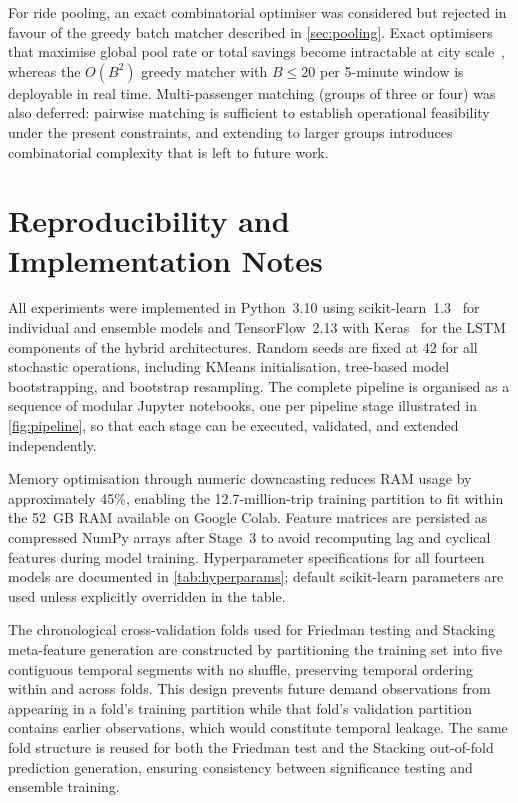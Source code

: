 For ride pooling, an exact combinatorial optimiser was considered but rejected in favour of the greedy batch matcher described in \autoref{sec:pooling}. Exact optimisers that maximise global pool rate or total savings become intractable at city scale~\parencite{agatz2012ridesharing}, whereas the $O(B^2)$ greedy matcher with $B \leq 20$ per 5-minute window is deployable in real time. Multi-passenger matching (groups of three or four) was also deferred: pairwise matching is sufficient to establish operational feasibility under the present constraints, and extending to larger groups introduces combinatorial complexity that is left to future work.

\section{Reproducibility and Implementation Notes}

All experiments were implemented in Python~3.10 using scikit-learn~1.3~\parencite{scikit-learn} for individual and ensemble models and TensorFlow~2.13 with Keras~\parencite{tensorflow2015} for the LSTM components of the hybrid architectures. Random seeds are fixed at 42 for all stochastic operations, including KMeans initialisation, tree-based model bootstrapping, and bootstrap resampling. The complete pipeline is organised as a sequence of modular Jupyter notebooks, one per pipeline stage illustrated in \autoref{fig:pipeline}, so that each stage can be executed, validated, and extended independently.

Memory optimisation through numeric downcasting reduces RAM usage by approximately 45\%, enabling the 12.7-million-trip training partition to fit within the 52~GB RAM available on Google Colab. Feature matrices are persisted as compressed NumPy arrays after Stage~3 to avoid recomputing lag and cyclical features during model training. Hyperparameter specifications for all fourteen models are documented in \autoref{tab:hyperparams}; default scikit-learn parameters are used unless explicitly overridden in the table.

The chronological cross-validation folds used for Friedman testing and Stacking meta-feature generation are constructed by partitioning the training set into five contiguous temporal segments with no shuffle, preserving temporal ordering within and across folds. This design prevents future demand observations from appearing in a fold's training partition while that fold's validation partition contains earlier observations, which would constitute temporal leakage. The same fold structure is reused for both the Friedman test and the Stacking out-of-fold prediction generation, ensuring consistency between significance testing and ensemble training.

